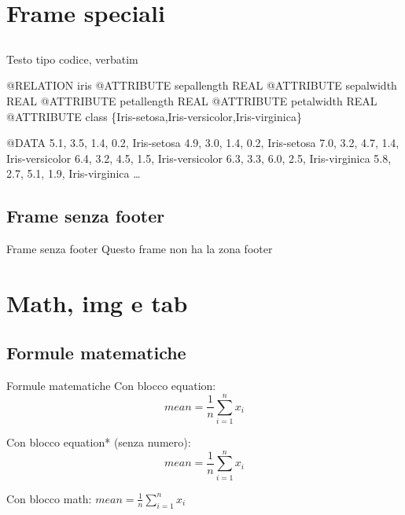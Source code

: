 \documentclass{beamer}
\begin{document}
\section{Frame speciali}
\subsection{}
\begin{frame}[fragile]{Testo tipo codice, verbatim}
\begin{semiverbatim}
@RELATION iris
\small{
@ATTRIBUTE sepallength	REAL
@ATTRIBUTE sepalwidth	REAL
@ATTRIBUTE petallength	REAL
@ATTRIBUTE petalwidth	REAL
@ATTRIBUTE class \{Iris-setosa,Iris-versicolor,Iris-virginica\}} 

@DATA
5.1, 3.5, 1.4, 0.2, Iris-setosa
4.9, 3.0, 1.4, 0.2, Iris-setosa
7.0, 3.2, 4.7, 1.4, Iris-versicolor
6.4, 3.2, 4.5, 1.5, Iris-versicolor
6.3, 3.3, 6.0, 2.5, Iris-virginica
5.8, 2.7, 5.1, 1.9, Iris-virginica
\dots
\end{semiverbatim}
\end{frame}

\subsection{Frame senza footer}
\begin{withoutfootline}
\begin{frame}{Frame senza footer}
	Questo frame non ha la zona footer
\end{frame}
\end{withoutfootline}




\section{Math, img e tab}
\subsection{Formule matematiche}
\begin{frame}{Formule matematiche}
Con blocco equation:
\begin{equation}
mean = \frac{1}{n}\sum_{i=1}^n x_i
\end{equation}

Con blocco equation* (senza numero):
\begin{equation*}
mean = \frac{1}{n}\sum_{i=1}^n x_i
\end{equation*}

Con blocco math:
\begin{math}
mean = \frac{1}{n}\sum_{i=1}^n x_i
\end{math}

\end{frame}
\end{document}
